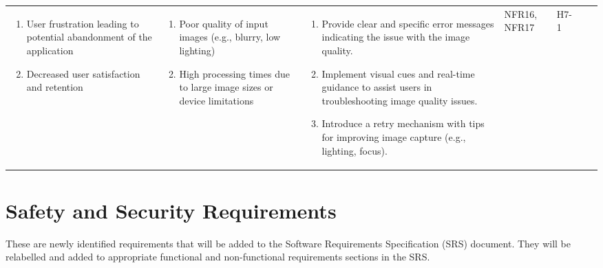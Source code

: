 \documentclass{article}
\begin{document}
\begin{landscape}
\begin{longtable}{|p{3cm}|p{4cm}|p{5cm}|p{5cm}|p{5cm}|p{1cm}|p{0.75cm}|}
    \begin{enumerate}[label=(\alph*), leftmargin=0.5cm]
        \item User frustration leading to potential abandonment of the application
        \item Decreased user satisfaction and retention
    \end{enumerate} &
    \begin{enumerate}[label=(\alph*), leftmargin=0.5cm]
        \item Poor quality of input images (e.g., blurry, low lighting)
        \item High processing times due to large image sizes or device limitations
    \end{enumerate} &
    \begin{enumerate}[label=(\alph*), leftmargin=0.5cm]
        \item Provide clear and specific error messages indicating the issue with the image quality.
        \item Implement visual cues and real-time guidance to assist users in troubleshooting image quality issues.
        \item Introduce a retry mechanism with tips for improving image capture (e.g., lighting, focus).
    \end{enumerate} &
    NFR16, NFR17 &
    H7-1 \\
\end{longtable}
    \newpage{}
\end{landscape}
\restoregeometry

\section{Safety and Security Requirements}

These are newly identified requirements that will be added to the Software
Requirements Specification (SRS) document. They will be relabelled and added to
appropriate functional and non-functional requirements sections in the SRS.
\end{document}
